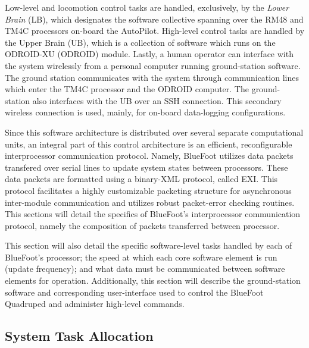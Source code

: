 	Low-level and locomotion control tasks are handled, exclusively, by the \emph{Lower Brain} (LB), which designates the software collective spanning over the RM48 and TM4C processors on-board the AutoPilot. High-level control tasks are handled by the Upper Brain (UB), which is a collection of software which runs on the ODROID-XU (ODROID) module. Lastly, a human operator can interface with the system wirelessly from a personal computer running ground-station software. The ground station  communicates with the system through communication lines which enter the TM4C processor and the ODROID computer. The ground-station also interfaces with the UB over an SSH connection. This secondary wireless connection is used, mainly, for on-board data-logging configurations.

	Since this software architecture is distributed over several separate computational units, an integral part of this control architecture is an efficient, reconfigurable interprocessor communication protocol. Namely, BlueFoot utilizes data packets transfered over serial lines to update system states between processors. These data packets are formatted using a binary-XML protocol, called EXI. This protocol facilitates a highly customizable packeting structure for asynchronous inter-module communication and utilizes robust packet-error checking routines. This sections will detail the specifics of BlueFoot's interprocessor communication protocol, namely the composition of packets transferred between processor. 

	This section will also detail the specific software-level tasks handled by each of BlueFoot's processor; the speed at which each core software element is run (update frequency); and what data must be communicated between software elements for operation. Additionally, this section will describe the ground-station software and corresponding user-interface used to control the BlueFoot Quadruped and administer high-level commands.
	
	\subsection{System Task Allocation}

